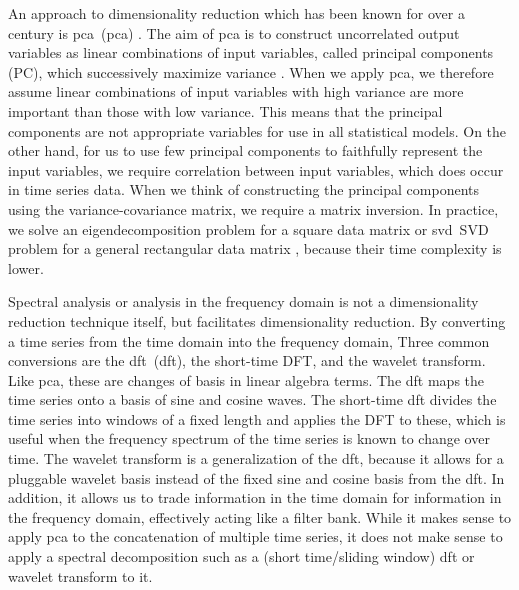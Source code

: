 An approach to dimensionality reduction which has been known for over a century is \acrlong{pca}~(\acrshort{pca}) \citep{doi:10.1080/14786440109462720,hotelling1933analysis}.
The aim of \acrshort{pca} is to construct uncorrelated output variables as linear combinations of input variables, called principal components (PC), which successively maximize variance \citep{doi:10.1098/rsta.2015.0202}.
When we apply \acrshort{pca}, we therefore assume linear combinations of input variables with high variance are more important than those with low variance.
This means that the principal components are not appropriate variables for use in all statistical models.
On the other hand, for us to use few principal components to faithfully represent the input variables, we require correlation between input variables, which does occur in time series data.
When we think of constructing the principal components using the variance-covariance matrix, we require a matrix inversion.
In practice, we solve an eigendecomposition problem for a square data matrix or \acrlong{svd}~\acrshort{SVD} problem for a general rectangular data matrix \citep{axler2015linear,strang1993introduction}, because their time complexity is lower.

Spectral analysis or analysis in the frequency domain is not a dimensionality reduction technique itself, but facilitates dimensionality reduction.
By converting a time series from the time domain into the frequency domain,
Three common conversions are the \acrlong{dft}~(\acrshort{dft}), the short-time DFT, and the wavelet transform.
Like \acrshort{pca}, these are changes of basis in linear algebra terms.
The \acrshort{dft} maps the time series onto a basis of sine and cosine waves.
The short-time \acrshort{dft} divides the time series into windows of a fixed length and applies the \acrshort{DFT} to these, which is useful when the frequency spectrum of the time series is known to change over time.
The wavelet transform is a generalization of the \acrshort{dft}, because it allows for a pluggable wavelet basis instead of the fixed sine and cosine basis from the \acrshort{dft}.
In addition, it allows us to trade information in the time domain for information in the frequency domain, effectively acting like a filter bank.
While it makes sense to apply \acrshort{pca} to the concatenation of multiple time series, it does not make sense to apply a spectral decomposition such as a (short time/sliding window) \acrshort{dft} or wavelet transform to it.


